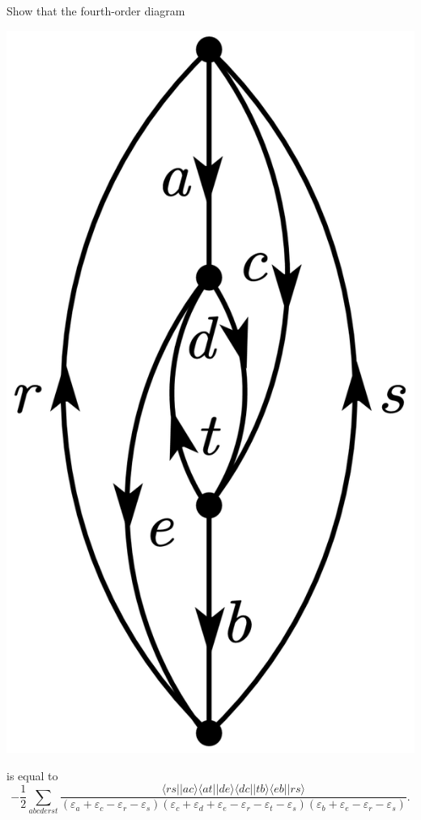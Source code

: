 \documentclass[a4paper]{book}
\newcounter{exercise}[chapter]
\begin{document}
	\begin{exercise}
	Show that the fourth-order diagram
	
	\begin{center}
	\includegraphics[scale=0.9]{./pictures/6.11/exercise.png}
	\end{center}
	is equal to
	\[
		-\frac{1}{2} \sum_{abcderst} \frac{ \langle rs || ac \rangle \langle at || de \rangle \langle dc || tb \rangle \langle eb||rs \rangle }{ ( \varepsilon_a + \varepsilon_c - \varepsilon_r - \varepsilon_s ) ( \varepsilon_c + \varepsilon_d + \varepsilon_e - \varepsilon_r - \varepsilon_t - \varepsilon_s ) ( \varepsilon_b + \varepsilon_e - \varepsilon_r - \varepsilon_s ) }.
	\]	
	
	\end{exercise}
	
\end{document}
